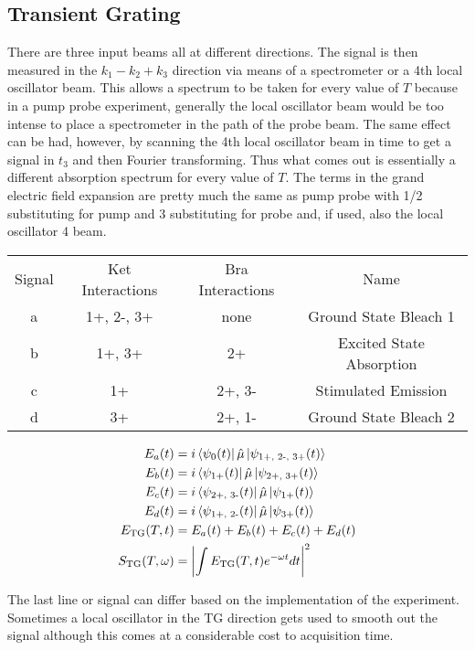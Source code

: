 \subsection{Transient Grating}
There are three input beams all at different directions.  The signal is then measured in the $k_1 - k_2 + k_3$ direction via means of a spectrometer or a 4th local oscillator beam.  This allows a spectrum to be taken for every value of $T$ because in a pump probe experiment, generally the local oscillator beam would be too intense to place a spectrometer in the path of the probe beam.  The same effect can be had, however, by scanning the 4th local oscillator beam in time to get a signal in $t_3$ and then Fourier transforming.  Thus what comes out is essentially a different absorption spectrum for every value of $T$.  The terms in the grand electric field expansion are pretty much the same as pump probe with 1/2 substituting for pump and 3 substituting for probe and, if used, also the local oscillator 4 beam.

\begin{tabular}{cccc}
Signal & Ket Interactions & Bra Interactions & Name \\
a & 1+, 2-, 3+ & none & Ground State Bleach 1 \\
b & 1+, 3+ & 2+ & Excited State Absorption \\
c & 1+ & 2+, 3- & Stimulated Emission \\
d & 3+ & 2+, 1- & Ground State Bleach 2
\end{tabular}
\begin{align}
	E_a (t) &=  i \bra{\psi_{0} (t)} \hat{\mu} \ket{\psi_{\text{1+, 2-, 3+}} (t)}\\
	E_b (t) &=  i \bra{\psi_{\text{1+}} (t)} \hat{\mu} \ket{\psi_{\text{2+, 3+}} (t)}\\
	E_c (t) &=  i \bra{\psi_{\text{2+, 3-}} (t)} \hat{\mu} \ket{\psi_{\text{1+}} (t)}\\
	E_d (t) &=  i \bra{\psi_{\text{1+, 2-}} (t)} \hat{\mu} \ket{\psi_{\text{3+}} (t)} \\
	E_{\text{TG}} (T, t) &= E_a (t)  + E_b (t)  + E_c (t)  + E_d (t) \\
	S_{\text{TG}}(T, \omega) &= \left| \int E_{\text{TG}} (T, t) e^{- \omega t}dt \right|^2
\end{align}

The last line or signal can differ based on the implementation of the experiment.  Sometimes a local oscillator in the TG direction gets used to smooth out the signal although this comes at a considerable cost to acquisition time.

